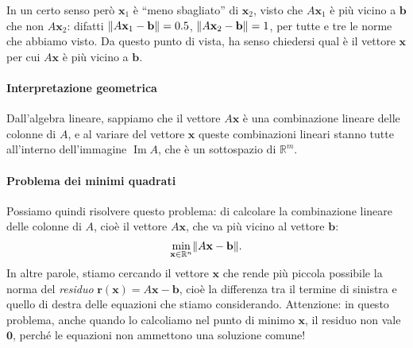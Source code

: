 \documentclass[a4paper]{report}
\DeclarePairedDelimiter{\norm}{\lVert}{\rVert}
\theoremstyle{definiton}
\theoremstyle{remark}
\newcommand{\x}{\mathbf{x}}
\renewcommand{\b}{\mathbf{b}}
\begin{document}
In un certo senso però $\x_1$ è ``meno sbagliato'' di $\x_2$, visto che $A\x_1$ è più vicino a $\b$ che non $A\x_2$: difatti $\norm{A\x_1-\b} = 0.5$, $\norm{A\x_2 - \b} = 1$, per tutte e tre le norme che abbiamo visto. Da questo punto di vista, ha senso chiedersi qual è il vettore $\x$ per cui $A\x$ è più vicino a $\b$.

\paragraph{Interpretazione geometrica} Dall'algebra lineare, sappiamo che il vettore $A\x$ è una combinazione lineare delle colonne di $A$, e al variare del vettore $\x$ queste combinazioni lineari stanno tutte all'interno dell'immagine $\operatorname{Im} A$, che è un sottospazio di $\mathbb{R}^m$.
\begin{center}

    
\end{center}

\paragraph{Problema dei minimi quadrati} Possiamo quindi risolvere questo problema: di calcolare la combinazione lineare delle colonne di $A$, cioè il vettore $A\x$, che va più vicino al vettore $\b$:
\begin{equation} \label{minresiduo}
    \min_{\x\in\mathbb{R}^n} \norm{A\x-\b}.    
\end{equation}
In altre parole, stiamo cercando il vettore $\x$ che rende più piccola possibile la norma del \emph{residuo} $\mathbf{r}(\x) = A \x - \b$, cioè la differenza tra il termine di sinistra e quello di destra delle equazioni che stiamo considerando. Attenzione: in questo problema, anche quando lo calcoliamo nel punto di minimo $\x$, il residuo non vale $\mathbf{0}$, perché le equazioni non ammettono una soluzione comune!
\end{document}
